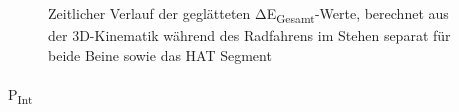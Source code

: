 \documentclass[
  letterpaper,
  DIV=11]{scrartcl}
\makeatletter
\let\oldparagraph\paragraph
\renewcommand{\paragraph}{
    \@ifstar
      \xxxParagraphStar
      \xxxParagraphNoStar
  }
\newcommand{\xxxParagraphStar}[1]{\oldparagraph*{#1}\mbox{}}
\newcommand{\xxxParagraphNoStar}[1]{\oldparagraph{#1}\mbox{}}
\makeatother
\begin{document}
\begin{figure}


\caption{\label{fig-PInt_Kinematik_HAT_delta_E_gesamt_stehen}Zeitlicher
Verlauf der geglätteten ΔE\textsubscript{Gesamt}-Werte, berechnet aus
der 3D-Kinematik während des Radfahrens im Stehen separat für beide
Beine sowie das HAT Segment}

\end{figure}%

\paragraph{\texorpdfstring{P\textsubscript{Int}}{PInt}}
\end{document}
